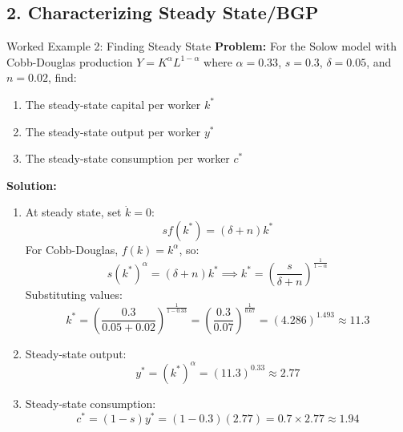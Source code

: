 \subsection{2. Characterizing Steady State/BGP}

\begin{frame}{Worked Example 2: Finding Steady State}
\textbf{Problem:} For the Solow model with Cobb-Douglas production $Y = K^\alpha L^{1-\alpha}$ where $\alpha = 0.33$, $s = 0.3$, $\delta = 0.05$, and $n = 0.02$, find:
\begin{enumerate}
\item The steady-state capital per worker $k^*$
\item The steady-state output per worker $y^*$
\item The steady-state consumption per worker $c^*$
\end{enumerate}

\bigskip
\textbf{Solution:}

\begin{enumerate}
\item At steady state, set $\dot{k} = 0$:
\[
sf(k^*) = (\delta + n)k^*
\]
For Cobb-Douglas, $f(k) = k^\alpha$, so:
\[
s(k^*)^\alpha = (\delta + n)k^* \implies k^* = \left(\frac{s}{\delta + n}\right)^{\frac{1}{1-\alpha}}
\]
Substituting values:
\[
k^* = \left(\frac{0.3}{0.05 + 0.02}\right)^{\frac{1}{1-0.33}} = \left(\frac{0.3}{0.07}\right)^{\frac{1}{0.67}} = (4.286)^{1.493} \approx 11.3
\]

\item Steady-state output:
\[
y^* = (k^*)^\alpha = (11.3)^{0.33} \approx 2.77
\]

\item Steady-state consumption:
\[
c^* = (1-s)y^* = (1-0.3)(2.77) = 0.7 \times 2.77 \approx 1.94
\]
\end{enumerate}


\end{frame}

